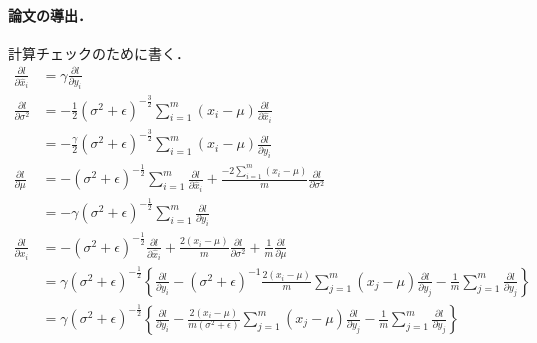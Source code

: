 \paragraph{論文\cite{ioffe2015batch}の導出．}
計算チェックのために書く．
\begin{align*}
 \frac{\partial l}{\partial \hat{x}_i}
 &=
 \gamma\frac{\partial l}{\partial y_i}
 \\
 \frac{\partial l}{\partial \sigma^2}
 &=
 -\frac{1}{2}(\sigma^2+\epsilon)^{-\frac{3}{2}}\sum_{i=1}^m(x_i-\mu)\frac{\partial l}{\partial \hat{x}_i}
 \\
 &=
 -\frac{\gamma}{2}(\sigma^2+\epsilon)^{-\frac{3}{2}}\sum_{i=1}^m(x_i-\mu)\frac{\partial l}{\partial y_i}
 \\
 \frac{\partial l}{\partial \mu}
 &=
 -(\sigma^2+\epsilon)^{-\frac{1}{2}}\sum_{i=1}^m\frac{\partial l}{\partial \hat{x}_i} +
 \frac{-2\sum_{i=1}^m(x_i-\mu)}{m}\frac{\partial l}{\partial \sigma^2}
 \\
 &=
 -\gamma(\sigma^2+\epsilon)^{-\frac{1}{2}}\sum_{i=1}^m\frac{\partial l}{\partial y_i}
 \\
 \frac{\partial l}{\partial x_i}
 &=
  -(\sigma^2+\epsilon)^{-\frac{1}{2}}\frac{\partial l}{\partial \hat{x}_i}
  +\frac{2(x_i-\mu)}{m}\frac{\partial l}{\partial \sigma^2}
  +\frac{1}{m}\frac{\partial l}{\partial \mu}
 \\
 &=
 \gamma(\sigma^2+\epsilon)^{-\frac{1}{2}}
 \left\{
 \frac{\partial l}{\partial y_i}
 -(\sigma^2+\epsilon)^{-1}\frac{2(x_i-\mu)}{m}\sum_{j=1}^m(x_j-\mu)\frac{\partial l}{\partial y_j}
 -\frac{1}{m}\sum_{j=1}^m\frac{\partial l}{\partial y_j}
 \right\}
 \\
 &=
 \gamma(\sigma^2+\epsilon)^{-\frac{1}{2}}
 \left\{
 \frac{\partial l}{\partial y_i}
 -\frac{2(x_i-\mu)}{m(\sigma^2+\epsilon)}\sum_{j=1}^m(x_j-\mu)\frac{\partial l}{\partial y_j}
 -\frac{1}{m}\sum_{j=1}^m\frac{\partial l}{\partial y_j}
 \right\}
\end{align*}
